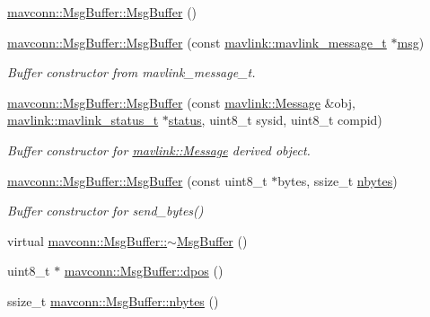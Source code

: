 \begin{DoxyCompactItemize}
\item 
\mbox{\hyperlink{group__mavconn_ga64da82fdf707ca5304fda5e686fe4f11}{mavconn\+::\+Msg\+Buffer\+::\+Msg\+Buffer}} ()
\item 
\mbox{\hyperlink{group__mavconn_ga202de878cea6b3fff8f8ef8c7f001cd5}{mavconn\+::\+Msg\+Buffer\+::\+Msg\+Buffer}} (const \mbox{\hyperlink{include__v0_89_2mavlink__types_8h_a63b963764c09dc72f4910c1521e325b9}{mavlink\+::mavlink\+\_\+message\+\_\+t}} $\ast$\mbox{\hyperlink{stratnode_8cpp_a82cfe4ed9bc9e1b07c8bf209c324d85b}{msg}})
\begin{DoxyCompactList}\small\item\em Buffer constructor from mavlink\+\_\+message\+\_\+t. \end{DoxyCompactList}\item 
\mbox{\hyperlink{group__mavconn_ga8bcb63913aa131f1c054dc1e18a4d945}{mavconn\+::\+Msg\+Buffer\+::\+Msg\+Buffer}} (const \mbox{\hyperlink{structmavlink_1_1Message}{mavlink\+::\+Message}} \&obj, \mbox{\hyperlink{include__v2_80_2mavlink__types_8h_aec6f7af3879252822d8fb108e97aafc2}{mavlink\+::mavlink\+\_\+status\+\_\+t}} $\ast$\mbox{\hyperlink{keyTalker_8cpp_a6e27f49150e9a14580fb313cc2777e00}{status}}, uint8\+\_\+t sysid, uint8\+\_\+t compid)
\begin{DoxyCompactList}\small\item\em Buffer constructor for \mbox{\hyperlink{structmavlink_1_1Message}{mavlink\+::\+Message}} derived object. \end{DoxyCompactList}\item 
\mbox{\hyperlink{group__mavconn_ga4555922debc003d9ba989aded6714fb5}{mavconn\+::\+Msg\+Buffer\+::\+Msg\+Buffer}} (const uint8\+\_\+t $\ast$bytes, ssize\+\_\+t \mbox{\hyperlink{group__mavconn_ga564c27473f42c6cea687c8b5bbbb1621}{nbytes}})
\begin{DoxyCompactList}\small\item\em Buffer constructor for send\+\_\+bytes() \end{DoxyCompactList}\item 
virtual \mbox{\hyperlink{group__mavconn_gac56cac6705c915b3c74c3d0b12c45939}{mavconn\+::\+Msg\+Buffer\+::$\sim$\+Msg\+Buffer}} ()
\item 
uint8\+\_\+t $\ast$ \mbox{\hyperlink{group__mavconn_ga0c971b3c0d8d540ccaf7e1929a5ecf07}{mavconn\+::\+Msg\+Buffer\+::dpos}} ()
\item 
ssize\+\_\+t \mbox{\hyperlink{group__mavconn_ga564c27473f42c6cea687c8b5bbbb1621}{mavconn\+::\+Msg\+Buffer\+::nbytes}} ()
\item 

\end{DoxyCompactItemize}
